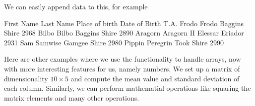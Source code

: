 \documentclass[letterpaper,10pt,english]{sphinxmanual}
\begin{document}
We can easily append data to this, for example

\begin{sphinxVerbatim}[commandchars=\\\{\}]
   \PYG{p}{[}\PYG{p}{]}
               \PYG{p}{[}\PYG{p}{]}
               \PYG{p}{[}\PYG{p}{]}
               \PYG{p}{[}\PYG{p}{]}
 \PYG{p}{[}\PYG{p}{]}
\end{sphinxVerbatim}

\begin{sphinxVerbatim}[commandchars=\\\{\}]
         First Name Last Name Place of birth  Date of Birth T.A.
Frodo         Frodo   Baggins          Shire                2968
Bilbo         Bilbo   Baggins          Shire                2890
Aragorn  Aragorn II   Elessar        Eriador                2931
Sam         Samwise    Gamgee          Shire                2980
Pippin     Peregrin      Took          Shire                2990
\end{sphinxVerbatim}

Here are other examples where we use the  functionality to handle arrays, now with more interesting features for us, namely numbers. We set up a matrix
of dimensionality \(10\times 5\) and compute the mean value and standard deviation of each column. Similarly, we can perform mathematial operations like squaring the matrix elements and many other operations.
\end{document}
